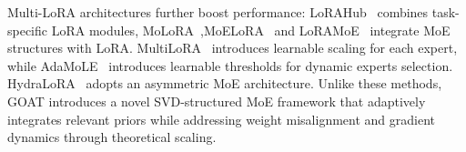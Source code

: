 Multi-LoRA architectures further boost performance: LoRAHub~\cite{huang2024lorahub} combines task-specific LoRA modules, MoLoRA~\cite{zadouri2024pushing},MoELoRA~\cite{liu2023moelora} and LoRAMoE~\cite{dou2023loramoe} integrate MoE structures with LoRA. 
MultiLoRA~\cite{wang2023multilora} introduces learnable scaling for each expert, while AdaMoLE~\cite{liu2024adamole} introduces learnable thresholds for dynamic experts selection. 
HydraLoRA~\cite{tian2024hydraloraasymmetricloraarchitecture} adopts an asymmetric MoE architecture. Unlike these methods, GOAT introduces a novel SVD-structured MoE framework that adaptively integrates relevant priors while addressing weight misalignment and gradient dynamics through theoretical scaling. 






